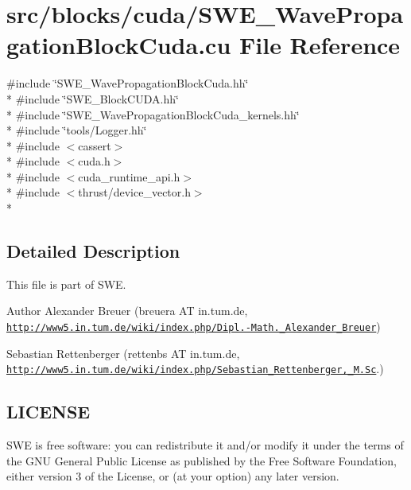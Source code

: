 \hypertarget{SWE__WavePropagationBlockCuda_8cu}{\section{src/blocks/cuda/\-S\-W\-E\-\_\-\-Wave\-Propagation\-Block\-Cuda.cu File Reference}
\label{SWE__WavePropagationBlockCuda_8cu}
}
{\ttfamily \#include \char`\"{}S\-W\-E\-\_\-\-Wave\-Propagation\-Block\-Cuda.\-hh\char`\"{}}\\*
{\ttfamily \#include \char`\"{}S\-W\-E\-\_\-\-Block\-C\-U\-D\-A.\-hh\char`\"{}}\\*
{\ttfamily \#include \char`\"{}S\-W\-E\-\_\-\-Wave\-Propagation\-Block\-Cuda\-\_\-kernels.\-hh\char`\"{}}\\*
{\ttfamily \#include \char`\"{}tools/\-Logger.\-hh\char`\"{}}\\*
{\ttfamily \#include $<$cassert$>$}\\*
{\ttfamily \#include $<$cuda.\-h$>$}\\*
{\ttfamily \#include $<$cuda\-\_\-runtime\-\_\-api.\-h$>$}\\*
{\ttfamily \#include $<$thrust/device\-\_\-vector.\-h$>$}\\*


\subsection{Detailed Description}
This file is part of S\-W\-E.

\begin{DoxyAuthor}{Author}
Alexander Breuer (breuera A\-T in.\-tum.\-de, \href{http://www5.in.tum.de/wiki/index.php/Dipl.-Math._Alexander_Breuer}{\tt http\-://www5.\-in.\-tum.\-de/wiki/index.\-php/\-Dipl.-\/\-Math.\-\_\-\-Alexander\-\_\-\-Breuer}) 

Sebastian Rettenberger (rettenbs A\-T in.\-tum.\-de, \href{http://www5.in.tum.de/wiki/index.php/Sebastian_Rettenberger,_M.Sc}{\tt http\-://www5.\-in.\-tum.\-de/wiki/index.\-php/\-Sebastian\-\_\-\-Rettenberger,\-\_\-\-M.\-Sc}.)
\end{DoxyAuthor}
\hypertarget{Writer_8hh_LICENSE}{}\subsection{L\-I\-C\-E\-N\-S\-E}\label{Writer_8hh_LICENSE}
S\-W\-E is free software\-: you can redistribute it and/or modify it under the terms of the G\-N\-U General Public License as published by the Free Software Foundation, either version 3 of the License, or (at your option) any later version.


